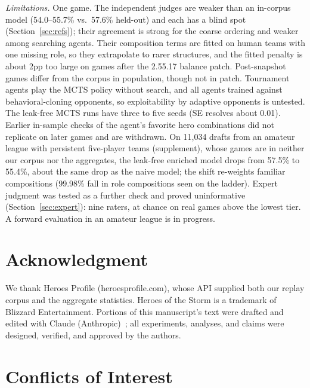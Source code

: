 \documentclass[journal]{IEEEtran}
\newif\ifanonymous
\begin{document}
\textit{Limitations.} One game. The independent judges are weaker than an in-corpus model (54.0--55.7\% vs.\ 57.6\% held-out) and each has a blind spot (Section~\ref{sec:refs}); their agreement is strong for the coarse ordering and weaker among searching agents. Their composition terms are fitted on human teams with one missing role, so they extrapolate to rarer structures, and the fitted penalty is about 2pp too large on games after the 2.55.17 balance patch. Post-snapshot games differ from the corpus in population, though not in patch. Tournament agents play the MCTS policy without search, and all agents trained against behavioral-cloning opponents, so exploitability by adaptive opponents is untested. The leak-free MCTS runs have three to five seeds (SE resolves about 0.01). Earlier in-sample checks of the agent's favorite hero combinations did not replicate on later games and are withdrawn. On 11,034 drafts from an amateur league with persistent five-player teams (supplement), whose games are in neither our corpus nor the aggregates, the leak-free enriched model drops from 57.5\% to 55.4\%, about the same drop as the naive model; the shift re-weights familiar compositions (99.98\% fall in role compositions seen on the ladder). Expert judgment was tested as a further check and proved uninformative (Section~\ref{sec:expert}): nine raters, at chance on real games above the lowest tier. A forward evaluation in an amateur league is in progress.

\ifanonymous
\section*{AI Disclosure}

Portions of this manuscript's text were drafted and edited with Claude (Anthropic)~\cite{claude}; all experiments, analyses, and claims were designed, verified, and approved by the authors.
\else
\section*{Acknowledgment}

We thank Heroes Profile (heroesprofile.com), whose API supplied both our replay corpus and the aggregate statistics. Heroes of the Storm is a trademark of Blizzard Entertainment. Portions of this manuscript's text were drafted and edited with Claude (Anthropic)~\cite{claude}; all experiments, analyses, and claims were designed, verified, and approved by the authors.
\fi

\section*{Conflicts of Interest}
\end{document}
